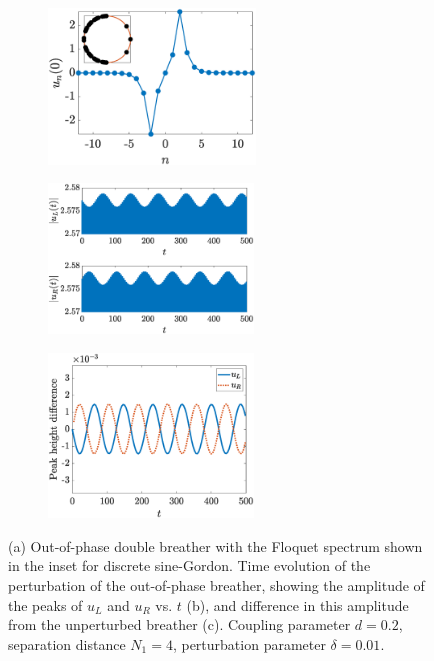 \documentclass[12pt,reqno]{amsart}
\theoremstyle{definition}
\begin{document}
\begin{figure}
	\begin{center}
	\begin{subfigure}{0.3\linewidth}
		\caption{}
		\includegraphics[width=5.5cm]{timestepN6spec.eps}
		\label{fig:timestepSGstablea}
	\end{subfigure}
	\begin{subfigure}{0.3\linewidth}
		\caption{}
		\includegraphics[width=5.45cm]{timestepN6.eps}
		\label{fig:timestepSGstableb}
	\end{subfigure}
	\begin{subfigure}{0.3\linewidth}
		\caption{}
		\includegraphics[width=5.45cm]{timestepN6pks.eps}
		\label{fig:timestepSGstablec}
	\end{subfigure}
	\end{center}
	\caption{(a) Out-of-phase double breather with the Floquet spectrum shown in the inset for discrete sine-Gordon. Time evolution of the perturbation of the out-of-phase breather, showing the amplitude of the peaks of $u_L$ and $u_R$ vs. $t$ (b), and difference in this amplitude from the unperturbed breather (c).  
	Coupling parameter $d=0.2$, separation distance $N_1 = 4$, perturbation parameter $\delta = 0.01$.}
	\label{fig:timestepSGstable}
\end{figure}
\end{document}
